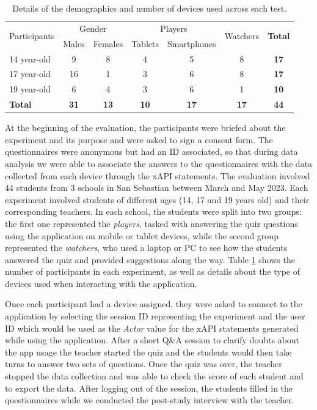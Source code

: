 \documentclass[pdflatex,sn-basic,iicol]{sn-jnl}%
\def\numschools/{3}
\def\numstudents/{44}
\begin{document}
\begin{table}[htbp]
\caption{Details of the demographics and number of devices used across each test.}
  \centering
  \begin{tabular}{l c c c c c c}
    \toprule
    \multirow{2}{*}{Participants} & \multicolumn{2}{c}{Gender} & \multicolumn{2}{c}{Players} & \multirow{2}{*}{Watchers} & \multirow{2}{*}{\textbf{Total}} \\
    \cmidrule(lr){2-3} \cmidrule(lr){4-5}
                            &  \multicolumn{1}{c}{Males} & \multicolumn{1}{c}{Females}  & \multicolumn{1}{c}{Tablets} & \multicolumn{1}{c}{Smartphones} & & \\
    \midrule
    14 year-old & 9 & 8 & 4 & 5 & 8 & \textbf{17} \\
    17 year-old & 16 & 1 & 3 & 6 & 8 & \textbf{17} \\
    19 year-old & 6 & 4 & 3 & 6 & 1 & \textbf{10} \\
    \midrule
    \textbf{Total} & \textbf{31} & \textbf{13} & \textbf{10} & \textbf{17} & \textbf{17} & \textbf{44}\\
    \bottomrule
  \end{tabular}
  \label{tab:details_participants}
\end{table}

At the beginning of the evaluation, the participants were briefed about the experiment and its purpose and were asked to sign a consent form. The questionnaires were anonymous but had an ID associated, so that during data analysis we were able to associate the answers to the questionnaires with the data collected from each device through the xAPI statements. The evaluation involved \numstudents/ students from \numschools/ schools in San Sebastian between March and May 2023. Each experiment involved students of different ages (14, 17 and 19 years old) and their corresponding teachers. In each school, the students were split into two groups: the first one represented the \textit{players}, tasked with answering the quiz questions using the application on mobile or tablet devices, while the second group represented the \textit{watchers}, who used a laptop or PC to see how the students answered the quiz and provided suggestions along the way. Table \ref{tab:details_participants} shows the number of participants in each experiment, as well as details about the type of devices used when interacting with the application.

Once each participant had a device assigned, they were asked to connect to the application by selecting the session ID representing the experiment and the user ID which would be used as the \textit{Actor} value for the xAPI statements generated while using the application. After a short Q\&A session to clarify doubts about the app usage the teacher started the quiz and the students would then take turns to answer two sets of questions. Once the quiz was over, the teacher stopped the data collection and was able to check the score of each student and to export the data. After logging out of the session, the students filled in the questionnaires while we conducted the post-study interview with the teacher. 
\end{document}
